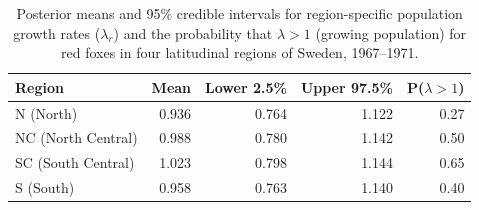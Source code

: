 
\begin{table}[!htbp]
  \centering
  \captionsetup{font=scriptsize}
  \caption{Posterior means and 95\% credible intervals for region-specific
    population growth rates ($\lambda_r$) and the probability that
    $\lambda > 1$ (growing population) for red foxes in four latitudinal
    regions of Sweden, 1967--1971.}
  \label{table:lambda}
  \scriptsize
  \begin{tabular}{lrrrr}
    \toprule
    Region             & Mean  & Lower 2.5\% & Upper 97.5\% & P($\lambda > 1$) \\
    \midrule
    N  (North)         & 0.936 & 0.764       & 1.122        & 0.27             \\
    NC (North Central) & 0.988 & 0.780       & 1.142        & 0.50             \\
    SC (South Central) & 1.023 & 0.798       & 1.144        & 0.65             \\
    S  (South)         & 0.958 & 0.763       & 1.140        & 0.40             \\
    \bottomrule
  \end{tabular}
\end{table}
